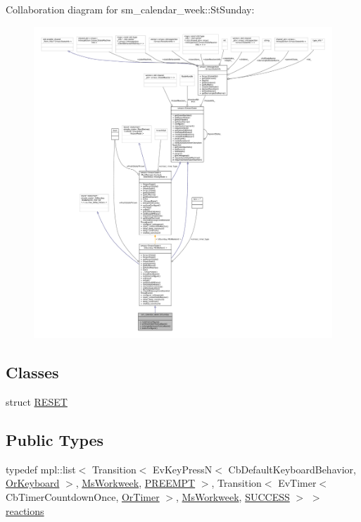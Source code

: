 Collaboration diagram for sm\+\_\+calendar\+\_\+week\+:\+:St\+Sunday\+:
\nopagebreak
\begin{figure}[H]
\begin{center}
\leavevmode
\includegraphics[width=350pt]{structsm__calendar__week_1_1StSunday__coll__graph}
\end{center}
\end{figure}
\subsection*{Classes}
\begin{DoxyCompactItemize}
\item 
struct \hyperlink{structsm__calendar__week_1_1StSunday_1_1RESET}{R\+E\+S\+ET}
\end{DoxyCompactItemize}
\subsection*{Public Types}
\begin{DoxyCompactItemize}
\item 
typedef mpl\+::list$<$ Transition$<$ Ev\+Key\+PressN$<$ Cb\+Default\+Keyboard\+Behavior, \hyperlink{classsm__calendar__week_1_1OrKeyboard}{Or\+Keyboard} $>$, \hyperlink{classsm__calendar__week_1_1MsWorkweek}{Ms\+Workweek}, \hyperlink{classPREEMPT}{P\+R\+E\+E\+M\+PT} $>$, Transition$<$ Ev\+Timer$<$ Cb\+Timer\+Countdown\+Once, \hyperlink{classsm__calendar__week_1_1OrTimer}{Or\+Timer} $>$, \hyperlink{classsm__calendar__week_1_1MsWorkweek}{Ms\+Workweek}, \hyperlink{classSUCCESS}{S\+U\+C\+C\+E\+SS} $>$ $>$ \hyperlink{structsm__calendar__week_1_1StSunday_af2828352a507a4c972e43b318bb59a51}{reactions}
\end{DoxyCompactItemize}
